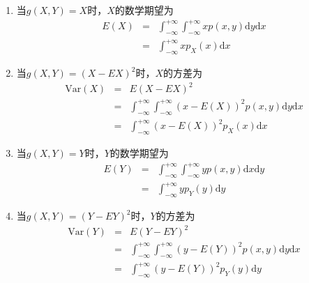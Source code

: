 \vspace{2cm}
\begin{remark}
\begin{enumerate}
   \item 当$g(X,Y)=X$时，$X$的数学期望为
    \begin{eqnarray*}
    E(X) &=&\int_{-\infty}^{+\infty} \int_{-\infty}^{+\infty} x p(x ,y) \text{d} y \text{d} x \\
    &=&\int_{-\infty}^{+\infty} x p_{X}(x) \text{d} x
    \end{eqnarray*}
    
    \item 当$g(X,Y)=(X-EX)^{2}$时，$X$的方差为
    \begin{eqnarray*}
\text{Var}(X)&=&E(X-E X)^{2} \\
&=&\int_{-\infty}^{+\infty} \int_{-\infty}^{+\infty}(x-E(X))^{2} p(x, y)  \text{d} y  \text{d}x \\
&=&\int_{-\infty}^{+\infty}(x-E(X))^{2} p_{X}(x)  \text{d} x
\end{eqnarray*}
\item 当$g(X,Y)=Y$时，$Y$的数学期望为
    \begin{eqnarray*}
    E(Y) &=&\int_{-\infty}^{+\infty} \int_{-\infty}^{+\infty} y p(x ,y) \text{d} x \text{d} y \\
    &=&\int_{-\infty}^{+\infty} y p_{Y}(y) \text{d} y
    \end{eqnarray*}
    \item 当$g(X,Y)=(Y-EY)^{2}$时，$Y$的方差为
    \begin{eqnarray*}
\text{Var}(Y)&=&E(Y-E Y)^{2} \\
&=&\int_{-\infty}^{+\infty} \int_{-\infty}^{+\infty}(y-E(Y))^{2} p(x, y)  \text{d} y \text{d} x\\
&=&\int_{-\infty}^{+\infty}(y-E(Y))^{2} p_{Y}(y)  \text{d} y
\end{eqnarray*}
\end{enumerate}
\end{remark}

